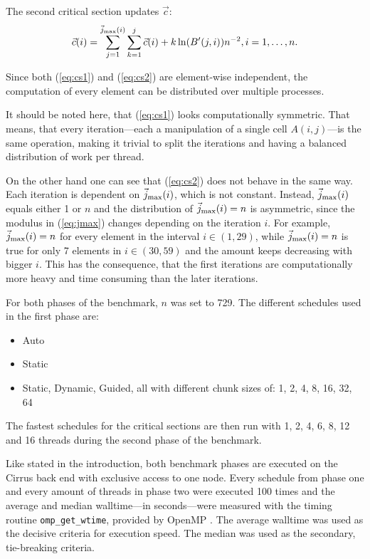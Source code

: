 \documentclass[twoside,11pt]{article}
\begin{document}
The second critical section updates $\vec{c}$:
\begin{align}
  \label{eq:cs2}
  \vec{c}(i) = \sum_{j=1}^{\vec{j}_{\text{max} }(i)}\sum_{k=1}^{j}
    \vec{c}(i) + k\ln(B'(j, i))n^{-2}, i=1,\dots,n.
\end{align}

Since both (\ref{eq:cs1}) and (\ref{eq:cs2}) are
element-wise independent, the computation of every element
can be distributed over multiple processes.

It should be noted here, that (\ref{eq:cs1}) looks
computationally symmetric.
That means, that every iteration---each a manipulation
of a single cell $A(i, j)$---is the same operation,
making it trivial to split the iterations and having a
balanced distribution of work per thread.

On the other hand one can see that (\ref{eq:cs2}) does not
behave in the same way.
Each iteration is dependent on $\vec{j}_{\text{max} }(i)$, which is not
constant.
Instead, $\vec{j}_{\text{max} }(i)$ equals either 1 or $n$ and the
distribution of $\vec{j}_{\text{max} }(i) = n$ is asymmetric, since
the modulus in (\ref{eq:jmax}) changes depending on the
iteration $i$.
For example, $\vec{j}_{\text{max} }(i) = n$ for every element in the
interval $i \in (1, 29)$, while $\vec{j}_{\text{max} }(i) = n$ is true for
only 7 elements in $i \in (30, 59)$ and the amount keeps
decreasing with bigger $i$.
This has the consequence, that the first iterations are
computationally more heavy and time consuming than
the later iterations.

For both phases of the benchmark, $n$ was set to 729.
The different schedules used in the first phase
are:
\begin{itemize}
  \item Auto
  \item Static
  \item Static, Dynamic, Guided, all with different
    chunk sizes of: 1, 2, 4, 8, 16, 32, 64
\end{itemize}

The fastest schedules for the critical sections
are then run with 1, 2, 4, 6, 8, 12 and 16 threads during
the second phase of the benchmark.

Like stated in the introduction, both benchmark phases are
executed on the Cirrus back end with exclusive access to
one node.
Every schedule from phase one and every amount of
threads in phase two were executed 100 times and the
average and median walltime---in seconds---were measured
with the timing routine \texttt{omp\_get\_wtime}, provided
by OpenMP \citep[see][Chapter 3.4.1]{openmp}.
The average walltime was used as the decisive criteria for
execution speed.
The median was used as the secondary, tie-breaking
criteria.
\end{document}
